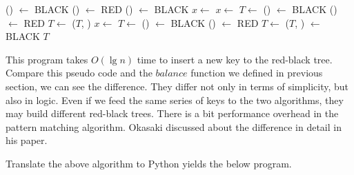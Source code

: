 \documentclass{article}
\begin{document}
\begin{algorithmic}[1]
      \State {}() $\gets$ BLACK
      \State {}() $\gets$ RED
      \State {}() $\gets$ BLACK
      \State $x \gets$ 
    \Else
          \State $x \gets$ 
          \State $T \gets$ 
        \EndIf
        \State {}() $\gets$ BLACK
        \State {}() $\gets$ RED
        \State $T \gets$ ($T$, )
      \Else
          \State $x \gets$ 
          \State $T \gets$ 
        \EndIf
        \State {}() $\gets$ BLACK
        \State {}() $\gets$ RED
        \State $T \gets$ ($T$, )
      \EndIf
    \EndIf
  \EndWhile
  \State {} $\gets$ BLACK
  \State \Return $T$
\EndFunction
\end{algorithmic}

This program takes $O(\lg n)$ time to insert a new key to the red-black tree.
Compare this pseudo code and the $balance$ function we defined in previous
section, we can see the difference. They differ not only in terms of
simplicity, but also in logic. Even if we feed the same series of keys to
the two algorithms, they may build different red-black trees. There
is a bit performance overhead in the pattern matching algorithm.
Okasaki discussed about the difference in detail in his paper\cite{okasaki}.

Translate the above algorithm to Python yields the below program.
\end{document}
